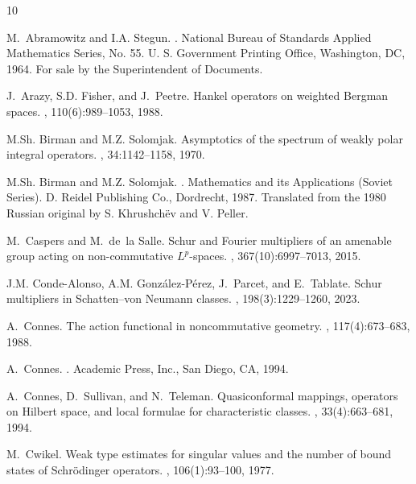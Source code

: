 \documentclass[12pt]{amsart}
\begin{document}
\begin{thebibliography}{10}

M.~Abramowitz and I.A. Stegun.
.
\newblock National Bureau of Standards Applied Mathematics Series, No. 55. U.
  S. Government Printing Office, Washington, DC, 1964.
\newblock For sale by the Superintendent of Documents.

J.~Arazy, S.D. Fisher, and J.~Peetre.
\newblock Hankel operators on weighted {B}ergman spaces.
, 110(6):989--1053, 1988.

M.Sh. Birman and M.Z. Solomjak.
\newblock Asymptotics of the spectrum of weakly polar integral operators.
, 34:1142--1158, 1970.

M.Sh. Birman and M.Z. Solomjak.
.
\newblock Mathematics and its Applications (Soviet Series). D. Reidel
  Publishing Co., Dordrecht, 1987.
\newblock Translated from the 1980 Russian original by S. Khrushch\"{e}v and V.
  Peller.

M.~Caspers and M.~de~la Salle.
\newblock Schur and {F}ourier multipliers of an amenable group acting on
  non-commutative {$L^p$}-spaces.
, 367(10):6997--7013, 2015.

J.M. Conde-Alonso, A.M. Gonz\'{a}lez-P\'{e}rez, J.~Parcet, and E.~Tablate.
\newblock Schur multipliers in {S}chatten--von {N}eumann classes.
, 198(3):1229--1260, 2023.

A.~Connes.
\newblock The action functional in noncommutative geometry.
, 117(4):673--683, 1988.

A.~Connes.
.
\newblock Academic Press, Inc., San Diego, CA, 1994.

A.~Connes, D.~Sullivan, and N.~Teleman.
\newblock Quasiconformal mappings, operators on {H}ilbert space, and local
  formulae for characteristic classes.
, 33(4):663--681, 1994.

M.~Cwikel.
\newblock Weak type estimates for singular values and the number of bound
  states of {S}chr\"{o}dinger operators.
, 106(1):93--100, 1977.


\end{thebibliography}
\end{document}
